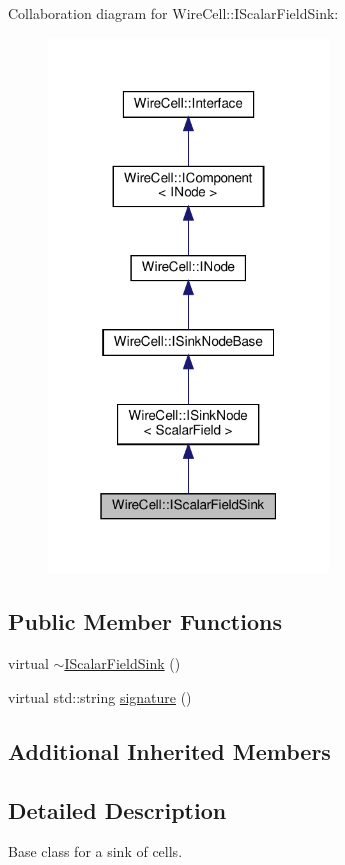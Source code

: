 Collaboration diagram for Wire\+Cell\+:\+:I\+Scalar\+Field\+Sink\+:
\nopagebreak
\begin{figure}[H]
\begin{center}
\leavevmode
\includegraphics[width=211pt]{class_wire_cell_1_1_i_scalar_field_sink__coll__graph}
\end{center}
\end{figure}
\subsection*{Public Member Functions}
\begin{DoxyCompactItemize}
\item 
virtual \hyperlink{class_wire_cell_1_1_i_scalar_field_sink_a9405cceeacbff687452d502e35f7a730}{$\sim$\+I\+Scalar\+Field\+Sink} ()
\item 
virtual std\+::string \hyperlink{class_wire_cell_1_1_i_scalar_field_sink_a4099838f1ea3c6ea0ea2e13bedebbfb7}{signature} ()
\end{DoxyCompactItemize}
\subsection*{Additional Inherited Members}


\subsection{Detailed Description}
Base class for a sink of cells. 

